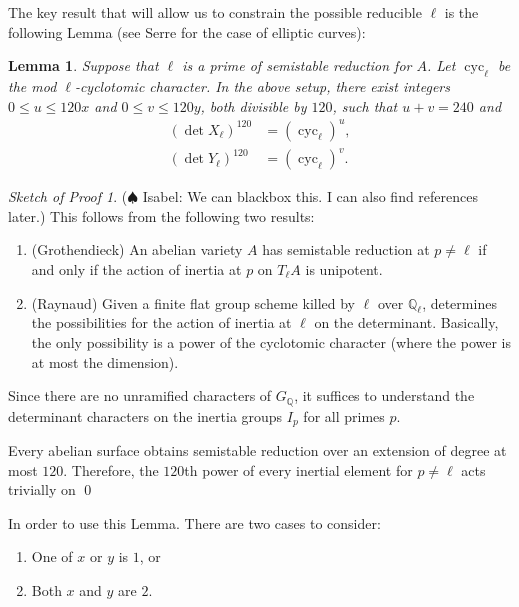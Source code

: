 \documentclass[11pt]{amsart}
\newcommand{\qq}{\mathbb{Q}}
\newcommand{\cyc}{\operatorname{cyc}}
\newcommand{\isabel}[1]{{\color{purple} ($\spadesuit$ Isabel: #1)}}
\newtheorem{lem}[thm]{Lemma}
\theoremstyle{definition}
\theoremstyle{remark}
\newtheorem*{skproof}{Sketch of Proof}
\begin{document}
The key result that will allow us to constrain the possible reducible $\ell$ is the following Lemma (see Serre for the case of elliptic curves):

\begin{lem}
Suppose that $\ell$ is a prime of semistable reduction for $A$.  Let $\cyc_\ell$ be the mod $\ell$-cyclotomic character.
In the above setup, there exist integers $0 \leq u \leq 120x$ and $0 \leq v \leq 120 y$, both divisible by $120$, such that $u + v = 240$ and
\begin{align*}
\left( \det X_{\ell} \right)^{120} &= \left(\cyc_\ell\right)^u, \\
\left( \det Y_{\ell} \right)^{120} &= \left(\cyc_\ell\right)^v.
\end{align*}
\end{lem}
\begin{skproof}
\isabel{We can blackbox this.  I can also find references later.} This follows from the following two results:
\begin{enumerate}
\item (Grothendieck) An abelian variety $A$ has semistable reduction at $p \neq \ell$ if and only if the action of inertia at $p$ on $T_\ell A$ is unipotent.
\item (Raynaud) Given a finite flat group scheme killed by $\ell$ over $\qq_\ell$, determines the possibilities for the action of inertia at $\ell$ on the determinant.  Basically, the only possibility is a power of the cyclotomic character (where the power is at most the dimension).
\end{enumerate}
Since there are no unramified characters of $G_\qq$, it suffices to understand the determinant characters on the inertia groups $I_p$ for all primes $p$.

Every abelian surface obtains semistable reduction over an extension of degree at most $120$.  Therefore, the $120$th power of every inertial element for $p\neq \ell$ acts trivially on 
\qed
\end{skproof}

In order to use this Lemma.  There are two cases to consider:
\begin{enumerate}
\item\label{odd} One of $x$ or $y$ is $1$, or
\item\label{even} Both $x$ and $y$ are $2$.
\end{enumerate}
\end{document}
